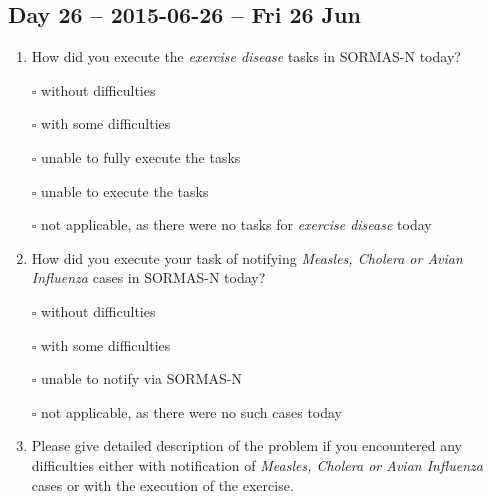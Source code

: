 \documentclass[a4paper, titlepage]{tufte-handout}
\begin{document}
\subsection{Day 26 -- 2015-06-26 -- Fri 26 Jun}
\label{sec-8-20}
\begin{enumerate}
\item How did you execute the \emph{exercise disease} tasks in SORMAS-N today?

\quad $\square$ without difficulties

\quad $\square$ with some difficulties

\quad $\square$ unable to fully execute the tasks

\quad $\square$ unable to execute the tasks

\quad $\square$ not applicable, as there were no tasks for \emph{exercise disease} today

\item How did you execute your task of notifying \emph{Measles, Cholera or Avian Influenza} cases in SORMAS-N today?

\quad $\square$ without difficulties

\quad $\square$ with some difficulties

\quad $\square$ unable to notify via SORMAS-N

\quad $\square$ not applicable, as there were no such cases today

\item Please give detailed description of the problem if you encountered any difficulties either with notification of \emph{Measles, Cholera or Avian Influenza} cases or with the execution of the exercise.

\hrulefill

\hrulefill

\hrulefill

\hrulefill

\hrulefill

\hrulefill

\hrulefill

\hrulefill

\hrulefill

\hrulefill
\end{enumerate}

\newpage
\end{document}
